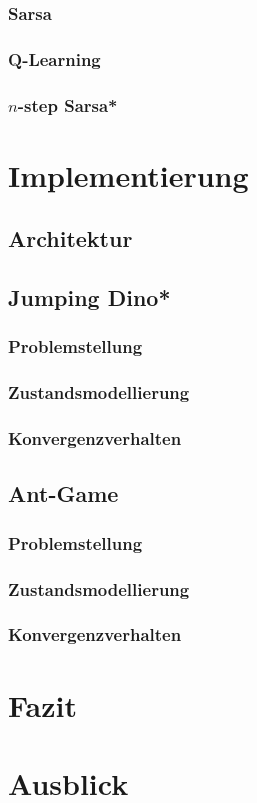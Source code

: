 \documentclass[12pt]{article}
\numberwithin{equation}{section}
\begin{document}
		\subsubsection{Sarsa}
		
		\pagebreak
		\subsubsection{Q-Learning}
		
		\pagebreak
		\subsubsection{$n$-step Sarsa*}

\section{Implementierung}
	\subsection{Architektur}
	\subsection{Jumping Dino*}
		\subsubsection{Problemstellung}
		\subsubsection{Zustandsmodellierung}
		\subsubsection{Konvergenzverhalten}
	\subsection{Ant-Game}
		\subsubsection{Problemstellung}
		\subsubsection{Zustandsmodellierung}
		\subsubsection{Konvergenzverhalten}

\section{Fazit}
\section{Ausblick}

\pagebreak


\pagebreak


\end{document}
